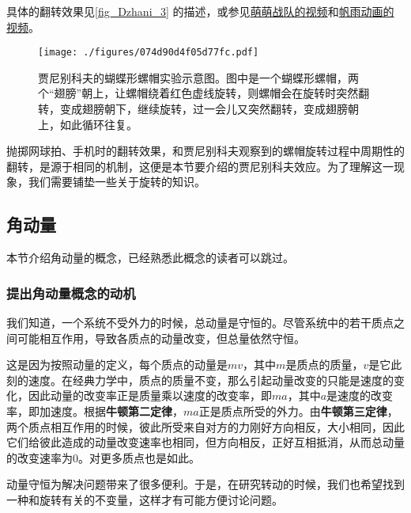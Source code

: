 具体的翻转效果见\autoref{fig_Dzhani_3} 的描述，或参见\href{https://www.bilibili.com/video/BV1jy4y1Y7CU/?share_source=copy_web&vd_source=5d336c88ab0583d823dccd3a9651b27b}{萌萌战队的视频}和\href{https://www.bilibili.com/video/BV12K411S7Gc/?spm_id_from=333.337.search-card.all.click&vd_source=0ae31f148e26bb548391e861d5f13610}{帆雨动画的视频}。


\begin{figure}[ht]
\centering
\texttt{[image: ./figures/074d90d4f05d77fc.pdf]}
\caption{贾尼别科夫的蝴蝶形螺帽实验示意图。图中是一个蝴蝶形螺帽，两个“翅膀”朝上，让螺帽绕着红色虚线旋转，则螺帽会在旋转时突然翻转，变成翅膀朝下，继续旋转，过一会儿又突然翻转，变成翅膀朝上，如此循环往复。} \label{fig_Dzhani_3}
\end{figure}



抛掷网球拍、手机时的翻转效果，和贾尼别科夫观察到的螺帽旋转过程中周期性的翻转，是源于相同的机制，这便是本节要介绍的贾尼别科夫效应。为了理解这一现象，我们需要铺垫一些关于旋转的知识。





\subsection{角动量}



本节介绍角动量的概念，已经熟悉此概念的读者可以跳过。


\subsubsection{提出角动量概念的动机}


我们知道，一个系统不受外力的时候，总动量是守恒的。尽管系统中的若干质点之间可能相互作用，导致各质点的动量改变，但总量依然守恒。

这是因为按照动量的定义，每个质点的动量是$mv$，其中$m$是质点的质量，$v$是它此刻的速度。在经典力学中，质点的质量不变，那么引起动量改变的只能是速度的变化，因此动量的改变率正是质量乘以速度的改变率，即$ma$，其中$a$是速度的改变率，即加速度。根据\textbf{牛顿第二定律}，$ma$正是质点所受的外力。由\textbf{牛顿第三定律}，两个质点相互作用的时候，彼此所受来自对方的力刚好方向相反，大小相同，因此它们给彼此造成的动量改变速率也相同，但方向相反，正好互相抵消，从而总动量的改变速率为$0$。对更多质点也是如此。


动量守恒为解决问题带来了很多便利。于是，在研究转动的时候，我们也希望找到一种和旋转有关的不变量，这样才有可能方便讨论问题。


